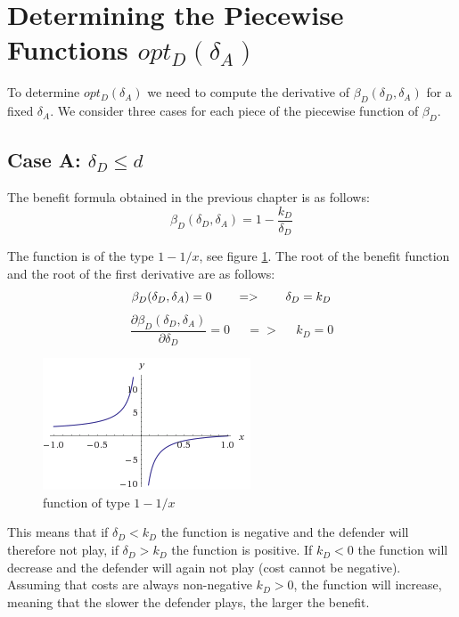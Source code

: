 \section{Determining the Piecewise Functions $opt_{D}(\delta_{A})$}

To determine $opt_{D}(\delta_{A})$ we need to compute the derivative of  $\beta_{D}(\delta_{D},\delta_{A}) $ for a fixed $\delta_{A}$.
 We consider three cases for each piece of the piecewise function of $\beta_{D}$.
 
 
\subsection*{Case A: $\delta_{D} \leq d$}

The benefit formula obtained in the previous chapter is as follows:
\begin{equation}
\beta_{D}(\delta_{D},\delta_{A}) = 1 - \dfrac{k_{D}}{\delta_{D}}
\end{equation}


The function is of the type $1-1/x$, see figure \ref{1x}. The root of the benefit function  and the root of the first derivative are as follows:
\begin{equation}
\beta_{D}(\delta_{D},\delta_{A}) =0  ~~~~~~ =>~~~~~~\delta_{D} = k_{D} \\
\end{equation}
\begin{equation}
\dfrac{\partial \beta_{D}(\delta_{D},\delta_{A})}{\partial \delta_{D}} =0 ~~~~~~ =>~~~~~~ k_{D} = 0
\end{equation}

\begin{figure}[hbtp]
\centering
\includegraphics[scale=1]{Images/1x.png}
\caption{function of type $1-1/x$}
\label{1x}
\end{figure}

This means that if $\delta_{D} < k_{D}$  the function is negative and the defender will therefore not play, if $\delta_{D} > k_{D}$ the function is positive. If $k_{D} < 0$ the function will decrease and the defender will again not play (cost cannot be negative).  Assuming that costs are always non-negative $k_{D} > 0$, the function will increase, meaning that the slower the defender plays, the larger the benefit.



